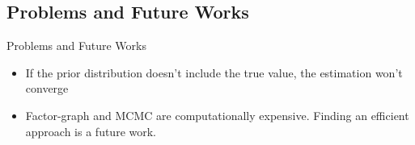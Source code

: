 \subsection{Problems and Future Works}
\begin{frame}{Problems and Future Works}
\begin{itemize}
    \item If the prior distribution doesn't include the true value, the estimation won't converge
    \item Factor-graph and MCMC are computationally expensive. Finding an efficient approach is a future work.
\end{itemize}
\end{frame}